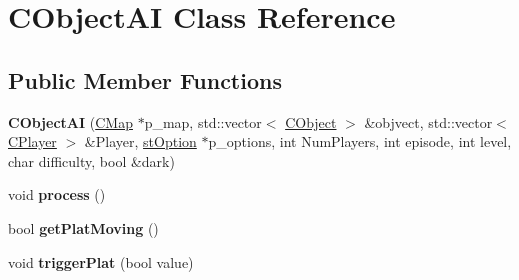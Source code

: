 \hypertarget{class_c_object_a_i}{
\section{CObjectAI Class Reference}
\label{class_c_object_a_i}
}
\subsection*{Public Member Functions}
\begin{DoxyCompactItemize}
\item 
\hypertarget{class_c_object_a_i_a2c031a1764beaa3e8a3cf2e871690a6c}{
{\bfseries CObjectAI} (\hyperlink{class_c_map}{CMap} $\ast$p\_\-map, std::vector$<$ \hyperlink{class_c_object}{CObject} $>$ \&objvect, std::vector$<$ \hyperlink{class_c_player}{CPlayer} $>$ \&Player, \hyperlink{structst_option}{stOption} $\ast$p\_\-options, int NumPlayers, int episode, int level, char difficulty, bool \&dark)}
\label{class_c_object_a_i_a2c031a1764beaa3e8a3cf2e871690a6c}

\item 
\hypertarget{class_c_object_a_i_acf852f7389ef4b1a8b4561b9026a5eff}{
void {\bfseries process} ()}
\label{class_c_object_a_i_acf852f7389ef4b1a8b4561b9026a5eff}

\item 
\hypertarget{class_c_object_a_i_a2fdd4254ed95fa261b39cfca525f1e71}{
bool {\bfseries getPlatMoving} ()}
\label{class_c_object_a_i_a2fdd4254ed95fa261b39cfca525f1e71}

\item 
\hypertarget{class_c_object_a_i_af6956fb890530ea8267d1b700db22be7}{
void {\bfseries triggerPlat} (bool value)}
\label{class_c_object_a_i_af6956fb890530ea8267d1b700db22be7}

\end{DoxyCompactItemize}


